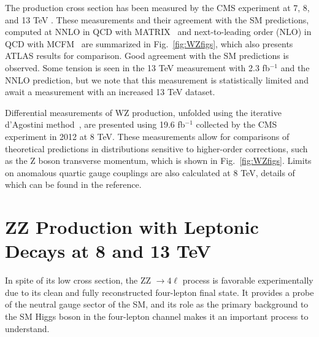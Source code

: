 \documentclass[10pt]{article}
\begin{document}
The production cross section has been measured by the CMS experiment at 7, 8, 
\cite{Khachatryan:2016poo}
and 13 TeV
\cite{Khachatryan:2016tgp}.
These measurements and their agreement with the SM
predictions, computed at NNLO in QCD with \textsc{MATRIX}~\cite{Grazzini:2016swo} and 
next-to-leading order (NLO) in 
QCD with \textsc{MCFM}~\cite{Campbell:2011bn}
are summarized in Fig.~\ref{fig:WZfigs}, which also presents ATLAS results for comparison. 
Good agreement with the SM predictions
is observed. Some tension is seen in the 13 TeV measurement with 2.3 fb$^{-1}$
and the NNLO prediction, but we note that this measurement is statistically
limited and await a measurement with an increased 13 TeV dataset.

Differential measurements of WZ production, unfolded using the 
iterative d'Agostini method~\cite{DAgostini:1994fjx}, are presented using 19.6 fb$^{-1}$
collected by the CMS experiment in 2012 at 8 TeV. These measurements allow for
comparisons of theoretical predictions in distributions sensitive 
to higher-order corrections, such as the Z boson transverse momentum, which is
shown in Fig.~\ref{fig:WZfigs}. Limits on anomalous quartic gauge couplings are
also calculated at 8 TeV, details of which can be found in the reference.


\section{ZZ Production with Leptonic Decays at 8 and 13 TeV}

In spite of its low cross section, the ZZ $\rightarrow 4\ell$ process 
is favorable experimentally due to its clean and fully reconstructed 
four-lepton final state. It provides a probe of the neutral gauge sector 
of the SM, and its role as the primary background to the SM Higgs
boson in the four-lepton channel makes it an important
process to understand.
\end{document}
